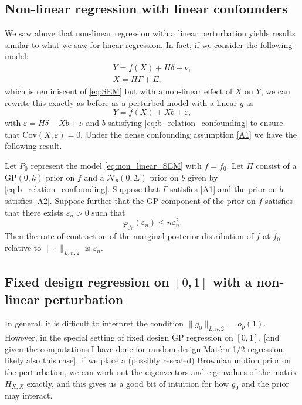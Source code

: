 \documentclass[11pt]{article}
\newcommand{\eps}{\varepsilon}
\newcommand{\cov}{\textrm{Cov}}
\numberwithin{equation}{section}
\begin{document}
\subsection{Non-linear regression with linear confounders}
We saw above that non-linear regression with a linear perturbation yields results similar to what we saw for linear regression. In fact, if we consider the following model:
\begin{align}
	Y = f(X) + H \delta + \nu, \label{eq:non_linear_SEM}\\
	X = H\Gamma + E, \nonumber
\end{align}
which is reminiscent of \eqref{eq:SEM} but with a non-linear effect of $X$ on $Y$, we can rewrite this exactly as before as a perturbed model with a linear $g$ as
$$
Y = f(X) + Xb + \eps,
$$
with $\eps = H\delta - Xb + \nu$ and $b$ satisfying \eqref{eq:b_relation_confounding} to ensure that $\cov (X, \eps) = 0$. Under the dense confounding assumption \eqref{A1} we have the following result.

\begin{theorem}\label{thm:gp_contraction_confounded}
	Let $P_0$ represent the model \eqref{eq:non_linear_SEM} with $f = f_0$. Let $\Pi$ consist of a GP$(0, k)$ prior on $f$ and a $\mathcal{N}_p(0, \Sigma)$ prior on $b$ given by \eqref{eq:b_relation_confounding}. Suppose that {\color{assumption} $\Gamma$ satisfies \eqref{A1}} and the prior on $b$ satisfies \eqref{A2}. 
	 Suppose further that the GP component of the prior on $f$ satisfies that there exists $\eps_n >0$ such that
	$$
	\varphi_{f_0}(\eps_n) \leq n\eps_n^2. 
	$$
	Then the rate of contraction of the marginal posterior distribution of $f$ at $f_0$ relative to $\| \cdot\|_{L,n,2}$ is $\eps_n$. 
	 \end{theorem}
	 
\subsection{Fixed design regression on $[0,1]$ with a non-linear perturbation}
In general, it is difficult to interpret the condition $\|g_0\|_{L, n, 2} = o_p(1)$. However, in the special setting of fixed design GP regression on $[0, 1]$, {\color{ared} [and given the computations I have done for random design Mat\'ern-1/2 regression, likely also this case]}, if we place a (possibly rescaled) Brownian motion prior on the perturbation, we can work out the eigenvectors and eigenvalues of the matrix $H_{X, X}$ exactly, and this gives us a good bit of intuition for how $g_0$ and the prior may interact. 
\end{document}

